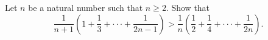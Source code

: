 Let $ n$ be a natural number such that $ n \geq 2$.  Show that\[ \frac {1}{n + 1} \left( 1 + \frac {1}{3} + \cdot \cdot \cdot + \frac {1}{2n - 1} \right) > \frac {1}{n} \left( \frac {1}{2} + \frac {1}{4} + \cdot \cdot \cdot + \frac {1}{2n} \right).
\]
